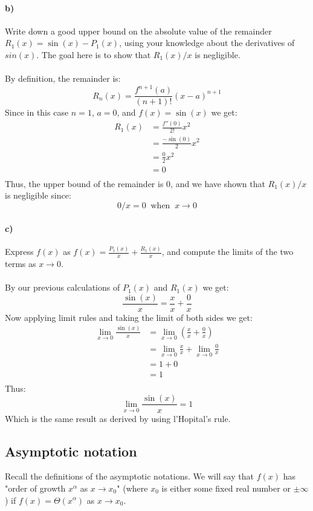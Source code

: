\documentclass{article}
\begin{document}
\paragraph{b)} Write down a good upper bound on the absolute value of the remainder $R_1(x) = \sin(x)-P_1(x)$, using your knowledge about the derivatives of $sin(x)$. The goal here is to show that $R_1(x)/x$ is negligible.
\\\\
By definition, the remainder is:
\[R_n(x)=\frac{f^{n+1}(a)}{(n+1)!}(x-a)^{n+1}\]
Since in this case $n=1$, $a=0$, and $f(x)=\sin(x)$ we get:
\begin{equation}
\begin{aligned}
R_1(x)&=\frac{f''(0)}{2!}x^2\\
&=\frac{-\sin(0)}{2}x^2\\
&=\frac{0}{2}x^2\\
&=0\\
\nonumber
\end{aligned}
\end{equation}
Thus, the upper bound of the remainder is 0, and we have shown that $R_1(x)/x$ is negligible since:
\[0/x = 0 \;\;\text{when}\;\; x\to 0\] 

\paragraph{c)} Express $f(x)$ as $f(x) = \frac{P_1(x)}{x} + \frac{R_1(x)}{x}$, and compute the limits of the two terms as $x\to0$.
\\\\
By our previous calculations of $P_1(x)$ and $R_1(x)$ we get:
\[\frac{\sin(x)}{x} = \frac{x}{x} + \frac{0}{x}\]
Now applying limit rules and taking the limit of both sides we get:
\begin{equation}
\begin{aligned}
\lim_{x\to 0}\frac{\sin(x)}{x} &= \lim_{x\to 0}\left(\frac{x}{x} + \frac{0}{x}\right)\\
&= \lim_{x\to 0}\frac{x}{x} + \lim_{x\to 0}\frac{0}{x}\\
&= 1 + 0\\
&= 1\\
\nonumber
\end{aligned}
\end{equation}
Thus:
\[\lim_{x\to 0}\frac{\sin(x)}{x} = 1\]
Which is the same result as derived by using l’Hopital’s rule.


\subsection{Asymptotic notation}
Recall the definitions of the asymptotic notations. We will say that $f(x)$ has "order of growth $x^\alpha$ as $x\to x_0$" (where $x_0$ is either some fixed real number or $\pm\infty$) if $f(x) = \Theta(x^\alpha)$ as $x\to x_0$.
\end{document}
